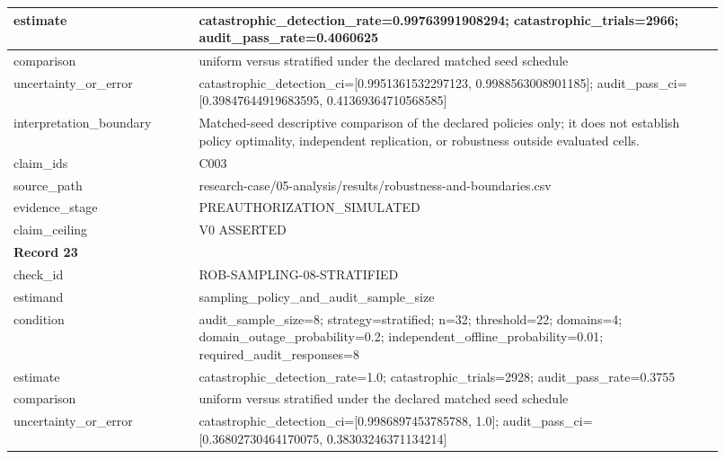 \begin{longtable}{|p{0.24\linewidth}|p{0.68\linewidth}|}
estimate & catastrophic\_\allowbreak{}detection\_\allowbreak{}rate=0.99763991908294;\allowbreak{} catastrophic\_\allowbreak{}trials=2966;\allowbreak{} audit\_\allowbreak{}pass\_\allowbreak{}rate=0.4060625 \\ \hline
comparison & uniform versus stratified under the declared matched seed schedule \\ \hline
uncertainty\_\allowbreak{}or\_\allowbreak{}error & catastrophic\_\allowbreak{}detection\_\allowbreak{}ci=[0.9951361532297123, 0.9988563008901185];\allowbreak{} audit\_\allowbreak{}pass\_\allowbreak{}ci=[0.39847644919683595, 0.41369364710568585] \\ \hline
interpretation\_\allowbreak{}boundary & Matched-seed descriptive comparison of the declared policies only;\allowbreak{} it does not establish policy optimality, independent replication, or robustness outside evaluated cells. \\ \hline
claim\_\allowbreak{}ids & C003 \\ \hline
source\_\allowbreak{}path & research-case/05-analysis/results/robustness-and-boundaries.csv \\ \hline
evidence\_\allowbreak{}stage & PREAUTHORIZATION\_\allowbreak{}SIMULATED \\ \hline
claim\_\allowbreak{}ceiling & V0 ASSERTED \\ \hline
\multicolumn{2}{|l|}{\textbf{Record 23}} \\ \hline
check\_\allowbreak{}id & ROB-SAMPLING-08-STRATIFIED \\ \hline
estimand & sampling\_\allowbreak{}policy\_\allowbreak{}and\_\allowbreak{}audit\_\allowbreak{}sample\_\allowbreak{}size \\ \hline
condition & audit\_\allowbreak{}sample\_\allowbreak{}size=8;\allowbreak{} strategy=stratified;\allowbreak{} n=32;\allowbreak{} threshold=22;\allowbreak{} domains=4;\allowbreak{} domain\_\allowbreak{}outage\_\allowbreak{}probability=0.2;\allowbreak{} independent\_\allowbreak{}offline\_\allowbreak{}probability=0.01;\allowbreak{} required\_\allowbreak{}audit\_\allowbreak{}responses=8 \\ \hline
estimate & catastrophic\_\allowbreak{}detection\_\allowbreak{}rate=1.0;\allowbreak{} catastrophic\_\allowbreak{}trials=2928;\allowbreak{} audit\_\allowbreak{}pass\_\allowbreak{}rate=0.3755 \\ \hline
comparison & uniform versus stratified under the declared matched seed schedule \\ \hline
uncertainty\_\allowbreak{}or\_\allowbreak{}error & catastrophic\_\allowbreak{}detection\_\allowbreak{}ci=[0.9986897453785788, 1.0];\allowbreak{} audit\_\allowbreak{}pass\_\allowbreak{}ci=[0.36802730464170075, 0.38303246371134214] \\ \hline

\end{longtable}
